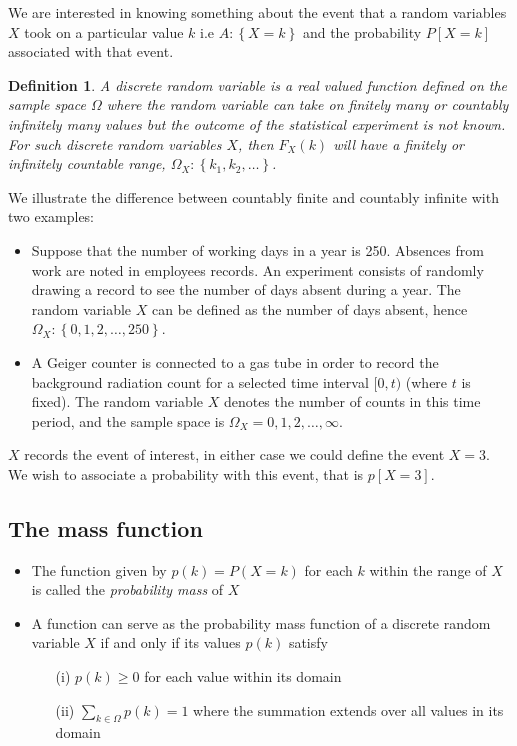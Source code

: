 \documentclass[12pt]{extbook}
\newtheorem{df}{Definition}[section]
\begin{document}
We are interested in knowing something about the event that a random variables $X$ took on a particular value $k$ i.e  $A: \left\{ X=k \right\}$ and the probability $P[X=k]$ associated with that event.

\begin{df}
A \emph{discrete} random variable is a real valued function defined on the
sample space $\Omega$ where the random variable can take on finitely many or countably infinitely many values but the outcome of the statistical experiment is not known.   For such discrete random variables $X$, then
$F_X(k)$ will have a finitely or infinitely countable range,
$\Omega_X: \left\{ k_1, k_2, \ldots \right\}$.
\end{df}


We illustrate the difference between countably finite and countably
infinite with two examples:

\begin{itemize}
\item Suppose that the number of working days in a year is 250.   Absences
from work are noted in employees records.   An experiment consists of
randomly drawing a record to see the number of days absent during a
year.   The random variable $X$ can be defined as the number of days
absent, hence $\Omega_X: \left\{ 0,1,2,\ldots,250 \right\}$.  

\item A Geiger counter is connected to a gas tube in order to record the
background radiation count for a selected time interval $[0,t)$ (where
$t$ is fixed).   The random variable $X$ denotes the number of counts
in this time period, and the sample space is $\Omega_X=0,1,2,\ldots,\infty$.
\end{itemize}


$X$ records the event of interest, in either case we could define the
event $X=3$.   We wish to associate a probability with this event,
that is $p[X=3]$.



\subsection{The mass function}

\begin{itemize}
\item The function given by $p(k) = P(X=k)$ for each $k$ within the range of $X$ is called the \emph{probability mass} of $X$
\item A function can serve as the probability mass function of a discrete random variable $X$ if and only if its values $p(k)$ satisfy
\begin{itemize}
\item[(i)] $p(k) \geq 0$ for each value within its domain
\item[(ii)] $\sum_{k \in \Omega} p(k) = 1$ where the summation extends over all values in its domain
\end{itemize}
\end{itemize}
\end{document}
